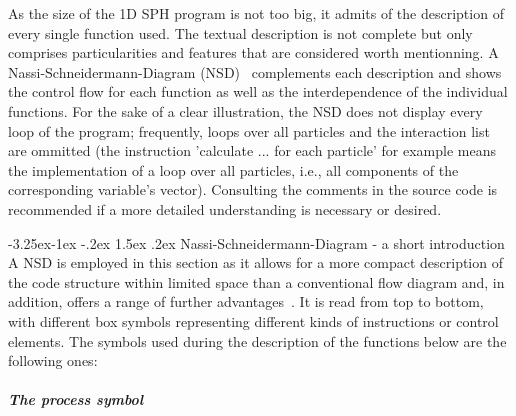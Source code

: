 \documentclass{report}
\makeatletter
\renewcommand\paragraph{\@startsection{paragraph}{4}{\z@}%
  {-3.25ex\@plus -1ex \@minus -.2ex}%
  {1.5ex \@plus .2ex}%
  {\normalfont\normalsize\bfseries}}
\makeatother
\begin{document}
As the size of the 1D SPH program is not too big, it admits of the description of every single function used. The textual description is not complete but only comprises particularities and features that are considered worth mentionning. A Nassi-Schneidermann-Diagram (NSD)~\cite{Nassi1973} complements each description and shows the control flow for each function as well as the interdependence of the individual functions. For the sake of a clear illustration, the NSD does not display every loop of the program; frequently, loops over all particles and the interaction list are ommitted (the instruction 'calculate ... for each particle' for example means the implementation of a loop over all particles, i.e., all components of the corresponding variable's vector).  Consulting the comments in the source code is recommended if a more detailed understanding is necessary or desired.

\paragraph{Nassi-Schneidermann-Diagram - a short introduction}
A NSD is employed in this section as it allows for a more compact description of the code structure within limited space than a conventional flow diagram and, in addition, offers a range of further advantages~\cite{Nassi1973}. It is read from top to bottom, with different box symbols representing different kinds of instructions or control elements. The symbols used during the description of the functions below are the following ones:

\subparagraph{The process symbol}

\end{document}
